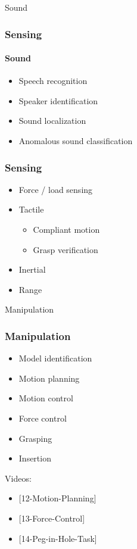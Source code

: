 \documentclass{beamer}
\begin{document}
\begin{frame}[standout]
     Sound
\end{frame}
\begin{frame}
\frametitle{Sensing}
\framesubtitle{Sound}
\begin{itemize}
    \item <1->Speech recognition
    \item <2->Speaker identification
    \item <3->Sound localization
    \item <4->Anomalous sound classification
\end{itemize}
\end{frame}

\begin{frame}
\frametitle{Sensing}
\begin{itemize}
    \item <1->Force / load sensing
    \item <2->Tactile
        \begin{itemize}
            \item Compliant motion
            \item Grasp verification
        \end{itemize}
    \item <3->Inertial
    \item <4->Range
\end{itemize}
\end{frame}

\begin{frame}[standout]
     Manipulation
\end{frame}


\begin{frame}
\frametitle{Manipulation}
\begin{itemize}
    \item <1->Model identification
    \item <2->Motion planning
    \item <3->Motion control
    \item <4->Force control
    \item <5->Grasping
    \item <6->Insertion
\end{itemize}

{\footnotesize
Videos:
\begin{itemize}
\item <2->{[12-Motion-Planning]}
\item <4->{[13-Force-Control]}
\item <6->{[14-Peg-in-Hole-Task]}
\end{itemize}}
\end{frame}
\end{document}
